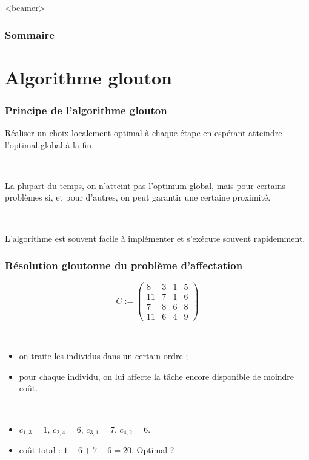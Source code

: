 \documentclass{beamer}
\begin{document}
\begin{frame}<beamer>
  \frametitle{Sommaire}
  \tableofcontents[sections={2-5}]
\end{frame}

\section{Algorithme glouton}

\begin{frame}
  \frametitle{Principe de l'algorithme glouton}

  Réaliser un choix localement optimal à chaque étape en espérant atteindre
  l'optimal global à la fin.

  ~
  
  La plupart du temps, on n'atteint pas l'optimum global, mais pour certains
  problèmes si, et pour d'autres, on peut garantir une certaine proximité. 

  

  ~
  
  L'algorithme est souvent facile à implémenter et s'exécute souvent rapidemment. 
  
\end{frame}

\begin{frame}
  \frametitle{Résolution gloutonne du problème d'affectation}

  \[
  C := \left(
  \begin{array}{cccc}
    8 & 3 & 1 & 5 \\
    11 & 7 & 1 & 6 \\
    7 & 8 & 6 & 8 \\
    11 & 6 & 4 & 9 
  \end{array}
  \right)
  \]

  ~
  
  \begin{itemize}
  \item on traite les individus dans un certain ordre ; 
  \item pour chaque individu, on lui affecte la tâche encore disponible de moindre coût.
  \end{itemize}

  ~
  
  \begin{itemize}
  \item $c_{1,3} = 1$, $c_{2,4} = 6$, $c_{3,1} = 7$, $c_{4,2} = 6$.
  \item coût total : $1 + 6 + 7 + 6 = 20$. Optimal ?
  \end{itemize}
  
\end{frame}
\end{document}

